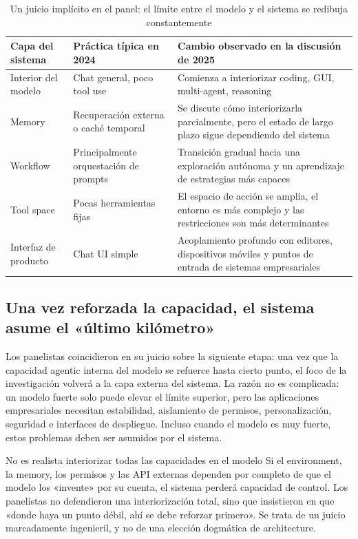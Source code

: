 \documentclass[a4paper]{article}
\begin{document}
\begin{table}[H]
\centering
\begin{tabular}{p{3.0cm}p{4.3cm}p{4.3cm}}
\toprule
\textbf{Capa del sistema} & \textbf{Práctica típica en 2024} & \textbf{Cambio observado en la discusión de 2025} \\
\midrule
Interior del modelo & Chat general, poco tool use & Comienza a interiorizar coding, GUI, multi-agent, reasoning \\
Memory & Recuperación externa o caché temporal & Se discute cómo interiorizarla parcialmente, pero el estado de largo plazo sigue dependiendo del sistema \\
Workflow & Principalmente orquestación de prompts & Transición gradual hacia una exploración autónoma y un aprendizaje de estrategias más capaces \\
Tool space & Pocas herramientas fijas & El espacio de acción se amplía, el entorno es más complejo y las restricciones son más determinantes \\
Interfaz de producto & Chat UI simple & Acoplamiento profundo con editores, dispositivos móviles y puntos de entrada de sistemas empresariales \\
\bottomrule
\end{tabular}
\caption{Un juicio implícito en el panel: el límite entre el modelo y el sistema se redibuja constantemente}
\end{table}

\subsection{Una vez reforzada la capacidad, el sistema asume el «último kilómetro»}
Los panelistas coincidieron en su juicio sobre la siguiente etapa: una vez que la capacidad agentic interna del modelo se refuerce hasta cierto punto, el foco de la investigación volverá a la capa externa del sistema. La razón no es complicada: un modelo fuerte solo puede elevar el límite superior, pero las aplicaciones empresariales necesitan estabilidad, aislamiento de permisos, personalización, seguridad e interfaces de despliegue. Incluso cuando el modelo es muy fuerte, estos problemas deben ser asumidos por el sistema.

\begin{warningbox}{No es realista interiorizar todas las capacidades en el modelo}
Si el environment, la memory, los permisos y las API externas dependen por completo de que el modelo los «invente» por su cuenta, el sistema perderá capacidad de control. Los panelistas no defendieron una interiorización total, sino que insistieron en que «donde haya un punto débil, ahí se debe reforzar primero». Se trata de un juicio marcadamente ingenieril, y no de una elección dogmática de architecture.
\end{warningbox}
\end{document}
